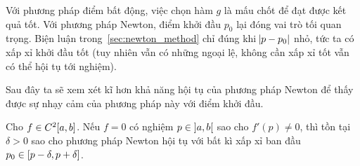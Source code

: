 \documentclass[../../Lectures]{subfiles}
\begin{document}
Với phương pháp điểm bất động, việc chọn hàm \(g\) là mấu chốt để đạt được kết
quả tốt. Với phương pháp Newton, điểm khởi đầu \(p_0\) lại đóng vai trò tối quan
trọng. Biện luận trong~\ref{sec:newton_method} chỉ đúng khi \(\abs{p - p_0}\)
nhỏ, tức ta có xấp xỉ khởi đầu tốt (tuy nhiên vẫn có những ngoại lệ, không cần
xấp xỉ tốt vẫn có thể hội tụ tới nghiệm).

Sau đây ta sẽ xem xét kĩ hơn khả năng hội tụ của phương pháp Newton để thấy được
sự nhạy cảm của phương pháp này với điểm khởi đầu.

\begin{ctheorem}{}{}
    Cho \(f \in C^2 \interval{a}{b}\). Nếu \(f = 0\) có nghiệm \(p \in
    \interval[open]{a}{b}\) sao cho \(f'(p) \neq 0\), thì tồn tại \(\delta > 0\)
    sao cho phương pháp Newton hội tụ với bất kì xấp xỉ ban đầu \(p_0 \in
    \interval{p - \delta}{p + \delta}\).
\end{ctheorem}
\end{document}
